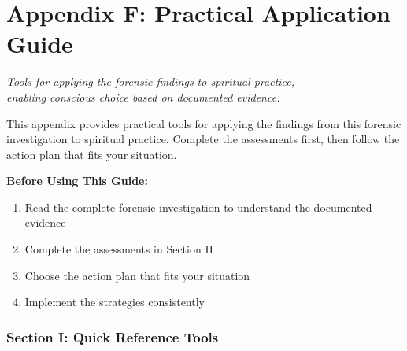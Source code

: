 \documentclass[11pt,twoside]{book}
\begin{document}
\part*{Appendix F: Practical Application Guide}
\label{sec:orge1478de}

{\centering\itshape Tools for applying the forensic findings to spiritual practice,\\enabling conscious choice based on documented evidence.\par}
\vspace{0.3cm}

\normalfont\justifying
This appendix provides practical tools for applying the findings from this forensic investigation to spiritual practice. Complete the assessments first, then follow the action plan that fits your situation.

\textbf{\textbf{Before Using This Guide:}}
\begin{enumerate}
\item Read the complete forensic investigation to understand the documented evidence
\item Complete the assessments in Section II
\item Choose the action plan that fits your situation
\item Implement the strategies consistently
\end{enumerate}
\section*{Section I: Quick Reference Tools}
\label{sec:orgf8ad2ce}
\end{document}
